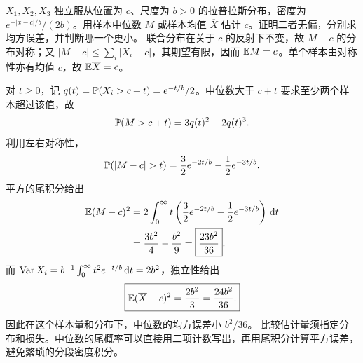 $X_1,X_2,X_3$ 独立服从位置为 $c$、尺度为 $b>0$ 的拉普拉斯分布，密度为 $e^{-|x-c|/b}/(2b)$。用样本中位数 $M$ 或样本均值 $\overline X$ 估计 $c$。证明二者无偏，分别求均方误差，并判断哪一个更小。
\solution 联合分布在关于 $c$ 的反射下不变，故 $M-c$ 的分布对称；又 $|M-c|\le\sum_i|X_i-c|$，其期望有限，因而 $\mathbb{E} M=c$。单个样本由对称性亦有均值 $c$，故 $\mathbb{E}\overline X=c$。

对 $t\ge0$，记 $q(t)=\mathbb{P}(X_i>c+t)=e^{-t/b}/2$。中位数大于 $c+t$ 要求至少两个样本超过该值，故
\[
\mathbb{P}(M>c+t)=3q(t)^2-2q(t)^3.
\]
利用左右对称性，
\[
\Prob(|M-c|>t)=\frac32e^{-2t/b}-\frac12e^{-3t/b}.
\]
平方的尾积分给出
\[
\begin{aligned}
\mathbb{E}(M-c)^2
&=2\int_0^\infty t\left(\frac32e^{-2t/b}-\frac12e^{-3t/b}\right)\,\mathrm{d} t\\
&=\frac{3b^2}{4}-\frac{b^2}{9}
=\boxed{\frac{23b^2}{36}}.
\end{aligned}
\]
而 $\operatorname{Var} X_i=b^{-1}\int_0^\infty t^2e^{-t/b}\,\mathrm{d} t=2b^2$，独立性给出
\[
\boxed{\mathbb{E}(\overline X-c)^2=\frac{2b^2}{3}=\frac{24b^2}{36}.}
\]
因此在这个样本量和分布下，中位数的均方误差小 $b^2/36$。
\insight 比较估计量须指定分布和损失。中位数的尾概率可以直接用二项计数写出，再用尾积分计算平方误差，避免繁琐的分段密度积分。
